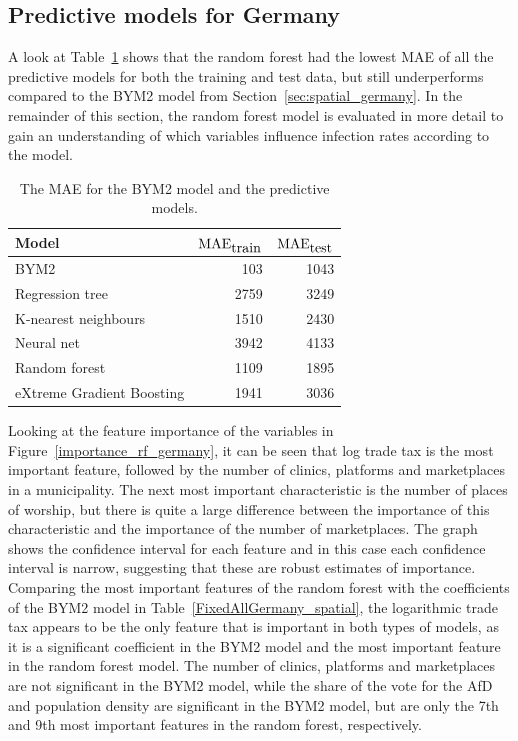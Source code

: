 \subsection{Predictive models for Germany}
A look at Table~\ref{pred_perf} shows that the random forest had the lowest MAE of all the predictive models for both the training and test data, but still underperforms compared to the BYM2 model from Section~\ref{sec:spatial_germany}. In the remainder of this section, the random forest model is evaluated in more detail to gain an understanding of which variables influence infection rates according to the model.
\begin{table}[H] 
\caption{The MAE for the BYM2 model and the predictive models. \label{pred_perf}}
\begin{tabular}{l r r}
\toprule
\textbf{Model}	& \textbf{$\hbox{MAE}_{\hbox{train}}$} & \textbf{$\hbox{MAE}_{\hbox{test}}$}\\
\midrule
BYM2 & 103 & 1043\\
Regression tree & 2759 & 3249 \\
K-nearest neighbours & 1510 & 2430 \\
Neural net & 3942 & 4133 \\
Random forest & 1109 & 1895 \\
eXtreme Gradient Boosting & 1941 & 3036 \\
\bottomrule
\end{tabular}
\end{table}
Looking at the feature importance of the variables in Figure~\ref{importance_rf_germany}, it can be seen that log trade tax is the most important feature, followed by the number of clinics, platforms and marketplaces in a municipality. The next most important characteristic is the number of places of worship, but there is quite a large difference between the importance of this characteristic and the importance of the number of marketplaces. The graph shows the confidence interval for each feature and in this case each confidence interval is narrow, suggesting that these are robust estimates of importance. Comparing the most important features of the random forest with the coefficients of the BYM2 model in Table~\ref{FixedAllGermany_spatial}, the logarithmic trade tax appears to be the only feature that is important in both types of models, as it is a significant coefficient in the BYM2 model and the most important feature in the random forest model. The number of clinics, platforms and marketplaces are not significant in the BYM2 model, while the share of the vote for the AfD and population density are significant in the BYM2 model, but are only the 7th and 9th most important features in the random forest, respectively.
